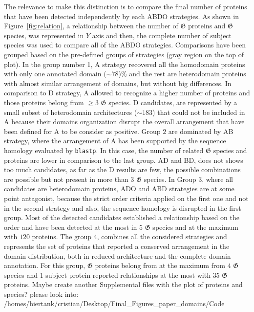 \documentclass[11pt]{article}
\newcommand{\TODO}[1]{\begingroup\color{red}#1\endgroup}
\begin{document}
The relevance to make this distinction is to compare the final number of proteins
that have been detected independently by each ABDO strategies. As shown in Figure~\ref{fig:relation}, 
a relationship between the number of $\boldsymbol{\mathfrak{G}}$ proteins 
and $\boldsymbol{\mathfrak{G}}$ species, was represented in $Y$ axis and then, the complete number
of subject species was used to compare all of the ABDO strategies. Comparisons have been grouped
based on the pre-defined groups of strategies (gray region on the top of plot). In the
group number 1, A strategy recovered all the homodomain proteins with only one annotated domain 
($\sim 78$)\% and the rest are heterodomain proteins with almost similar arrangement of domains,
but without big differences. In comparison to D strategy, A allowed to recognize a higher 
number of proteins and those proteins belong from $\geq 3$ $\boldsymbol{\mathfrak{G}}$ species. D
candidates, are represented by a small subset of heterodomain architectures ($\sim 183$) that
could not be included in A because their domains organization disrupt the overall arrangement
that have been defined for A to be consider as positive. Group $2$ are dominated by AB strategy,
where the arrangement of A has been supported by the sequence homology evaluated by \texttt{blastp}.
In this case, the number of related $\boldsymbol{\mathfrak{G}}$ species and proteins are lower in
comparison to the last group. AD and BD, does not shows too much candidates, as far as the D results 
are few, the possible combinations are possible but not present in more than $3$ 
$\boldsymbol{\mathfrak{G}}$ species. In Group $3$, where all candidates are heterodomain proteins,
ADO and ABD strategies are at some point antagonist, because the strict order 
criteria applied on the first one and not in the second strategy and also, the sequence 
homology is disrupted in the first group. Most of the detected candidates established 
a relationship based on the order and have been detected at the most in $5$ 
$\boldsymbol{\mathfrak{G}}$ species and at the maximum with $120$ proteins. The group 4, combines
all the considered strategies and represents the set of proteins that reported a
conserved arrangement in the domain distribution, both in reduced architecture and the
complete domain annotation. For this group, $\boldsymbol{\mathfrak{G}}$ proteins belong from 
at the maximum from $4$ $\boldsymbol{\mathfrak{G}}$ species and $1$ subject protein 
reported relationships at the most with $35$ $\boldsymbol{\mathfrak{G}}$ proteins.
\TODO{Maybe create another Supplemental files with the plot of proteins and species?
please look into: /homes/biertank/cristian/Desktop/Final\_Figures\_paper\_domains/Code}
\end{document}
